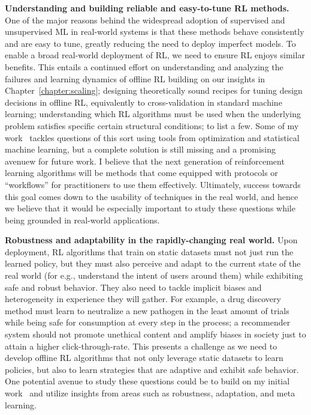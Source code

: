\documentclass[../thesis.tex]{subfiles}
\begin{document}
{\textbf{Understanding and building reliable and easy-to-tune RL methods.}} One of the major reasons behind the widespread adoption of supervised and unsupervised ML in real-world systems is that these methods behave consistently and are easy to tune, greatly reducing the need to deploy imperfect models. To enable a broad real-world deployment of RL, we need to ensure RL enjoys similar benefits. This entails a continued effort on understanding and analyzing the failures and learning dynamics of offline RL building on our insights in Chapter~\ref{chapter:scaling}; designing theoretically sound recipes for tuning design decisions in offline RL, equivalently to cross-validation in standard machine learning; understanding which RL algorithms must be used when the underlying problem satisfies specific certain structural conditions; to list a few. Some of my work~\citep{kumar2021workflow,kumar2022should} tackles questions of this sort using tools from optimization and statistical machine learning, but a complete solution is still missing and a promising avenuew for future work. I believe that the next generation of reinforcement learning algorithms will be methods that come equipped with protocols or ``workflows'' for practitioners to use them effectively. Ultimately, success towards this goal comes down to the usability of techniques in the real world, and hence we believe that it would be especially important to study these questions while being grounded in real-world applications.

{\textbf{Robustness and adaptability in the rapidly-changing real world.}} Upon deployment, RL algorithms that train on static datasets must not just run the learned policy, but they must also perceive and adapt to the current state of the real world (for e.g., understand the intent of users around them) while exhibiting safe and robust behavior. They also need to tackle implicit biases and heterogeneity in experience they will gather. For example, a drug discovery method must learn to neutralize a new pathogen in the least amount of trials while being safe for consumption at every step in the process; a recommender system should not promote unethical content and amplify biases in society just to attain a higher click-through-rate. This presents a challenge as we need to develop offline RL algorithms that not only leverage static datasets to learn policies, but also to learn strategies that are adaptive and exhibit safe behavior. One potential avenue to study these questions could be to build on my initial work~\citep{bharadhwaj2020conservative,ajay2020opal} and utilize insights from areas such as robustness, adaptation, and meta learning.
\end{document}
